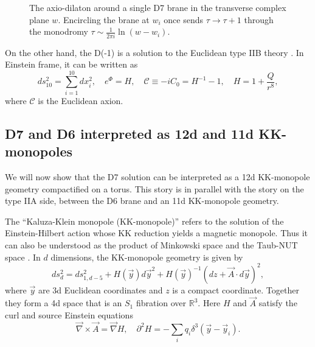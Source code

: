 \begin{figure}[ht]
\centering
{}
\caption{The axio-dilaton around a single D7 brane in the transverse complex plane $w$. Encircling the brane at $w_i$ once sends $\tau\to\tau+1$ through the monodromy $\tau\sim\frac{1}{2\pi i}\ln(w-w_i)$.
}
\label{fig:d7-monodromy}
\end{figure}

On the other hand, the D(-1) is a solution to the Euclidean type IIB theory \cite{Gibbons:1995vg}.
In Einstein frame, it can be written as
\begin{equation}
ds_{10}^2 = \sum_{i=1}^{10} dx_i^2,\quad
e^\Phi = H, \quad\mathcal C\equiv-iC_0 = H^{-1}-1,\quad
H=1+\frac{Q}{r^8},
\label{D-1 background}
\end{equation}
where $\mathcal{C}$ is the Euclidean axion.

\subsection{D7 and D6 interpreted as 12d and 11d KK-monopoles}
We will now show that the D7 solution can be interpreted as a 12d KK-monopole geometry compactified on a torus.
This story is in parallel with the story on the type IIA side, between the D6 brane and an 11d KK-monopole geometry.

The ``Kaluza-Klein monopole (KK-monopole)'' \cite{Gross:1983hb,Sorkin:1983ns} refers to the solution of the Einstein-Hilbert action whose KK reduction yields a magnetic monopole.
Thus it can also be understood as the product of Minkowski space and the Taub-NUT space \cite{Ortin:2015hya}.
In $d$ dimensions, the KK-monopole geometry is given by
\cite{Eguchi:1980jx}
\begin{equation}
ds_d^2 = ds_{1,d-5}^2 + H(\vec{y})d\vec{y}^2 + H(\vec{y})^{-1}(dz + \vec{A}\cdot d\vec{y})^2,
\label{d-dim KK-monopole}
\end{equation}
where $\vec{y}$ are 3d Euclidean coordinates and $z$ is a compact coordinate.
Together they form a 4d space that is an $S_1$ fibration over $\mathbb{R}^3$.
Here $H$ and $\vec{A}$ satisfy the curl and source Einstein equations
\begin{equation}
\vec{\nabla} \times \vec A = \vec\nabla H,\quad
\partial^2 H=-\sum_i q_i \delta^3(\vec{y}-\vec{y}_i).
\label{kk monopole einstein eqs}
\end{equation}

